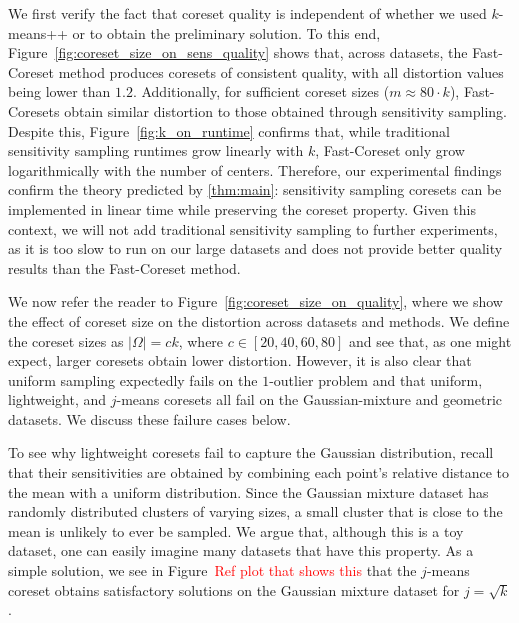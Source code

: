 We first verify the fact that coreset quality is independent of whether we used $k$-means++ or \fkmeans to obtain the preliminary solution. To this end,
Figure~\ref{fig:coreset_size_on_sens_quality} shows that, across datasets, the Fast-Coreset method produces coresets of consistent quality, with all distortion
values being lower than $1.2$. Additionally, for sufficient coreset sizes ($m \approx 80\cdot k$), Fast-Coresets obtain similar distortion to those obtained
through sensitivity sampling. Despite this, Figure~\ref{fig:k_on_runtime} confirms that, while traditional sensitivity sampling runtimes grow linearly with $k$,
Fast-Coreset only grow logarithmically with the number of centers.  Therefore, our experimental findings confirm the theory predicted by \cref{thm:main}:
sensitivity sampling coresets can be implemented in linear time while preserving the coreset property. Given this context, we will not add traditional
sensitivity sampling to further experiments, as it is too slow to run on our large datasets and does not provide better quality results than the Fast-Coreset
method.



We now refer the reader to Figure~\ref{fig:coreset_size_on_quality}, where we show the effect of coreset size on the distortion across datasets and methods.  We
define the coreset sizes as $|\Omega| = ck$, where $c \in [20, 40, 60, 80]$ and see that, as one might expect, larger coresets obtain lower distortion.
However, it is also clear that uniform sampling expectedly fails on the $1$-outlier problem and that uniform, lightweight, and $j$-means coresets all fail on
the Gaussian-mixture and geometric datasets.  We discuss these failure cases below.



To see why lightweight coresets fail to capture the Gaussian distribution, recall that their sensitivities are obtained by combining each point's relative
distance to the mean with a uniform distribution. Since the Gaussian mixture dataset has randomly distributed clusters of varying sizes, a small cluster that is
close to the mean is unlikely to ever be sampled. We argue that, although this is a toy dataset, one can easily imagine many datasets that have this property.
As a simple solution, we see in Figure~\textcolor{red}{Ref plot that shows this} that the $j$-means coreset obtains satisfactory solutions on the Gaussian
mixture dataset for $j = \sqrt{k}$.


